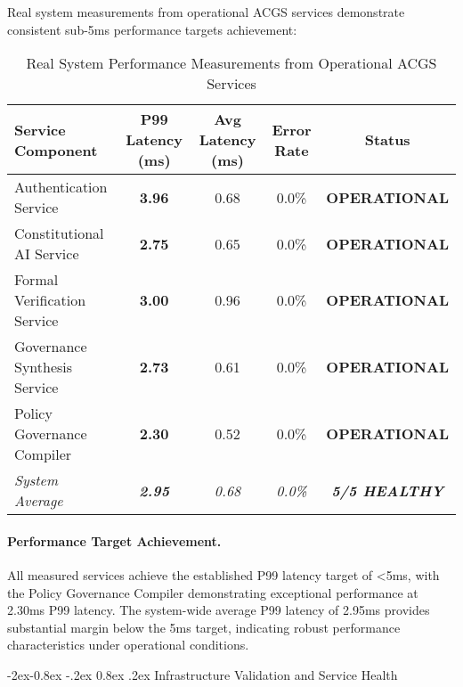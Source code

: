 \documentclass[manuscript,screen,9pt]{acmart}
\makeatletter
\renewcommand\subsubsection{\@startsection{subsubsection}{3}{\z@}%
  {-2ex\@plus -0.8ex \@minus -.2ex}%
  {0.8ex \@plus .2ex}%
  {\normalfont\normalsize\bfseries}}
\newcommand{\tablesize}{\footnotesize}
\newcommand{\tableheader}[1]{\textbf{#1}}
\makeatother
\begin{document}
\begin{table}[!htb]
Real system measurements from operational ACGS services demonstrate consistent sub-5ms performance targets achievement:

\begin{table}[!htb]
\centering
\caption{Real System Performance Measurements from Operational ACGS Services}
\label{tab:real_system_performance}
\tablesize
\begin{tabular}{@{}lcccc@{}}
\toprule
\tableheader{Service Component} & \tableheader{P99 Latency (ms)} & \tableheader{Avg Latency (ms)} & \tableheader{Error Rate} & \tableheader{Status} \\
\midrule
Authentication Service & \textbf{3.96} & 0.68 & 0.0\% & \textbf{OPERATIONAL} \\
Constitutional AI Service & \textbf{2.75} & 0.65 & 0.0\% & \textbf{OPERATIONAL} \\
Formal Verification Service & \textbf{3.00} & 0.96 & 0.0\% & \textbf{OPERATIONAL} \\
Governance Synthesis Service & \textbf{2.73} & 0.61 & 0.0\% & \textbf{OPERATIONAL} \\
Policy Governance Compiler & \textbf{2.30} & 0.52 & 0.0\% & \textbf{OPERATIONAL} \\
\midrule
\textit{System Average} & \textit{\textbf{2.95}} & \textit{0.68} & \textit{0.0\%} & \textit{\textbf{5/5 HEALTHY}} \\
\bottomrule
\end{tabular}
\end{table}

\paragraph{Performance Target Achievement.} All measured services achieve the established P99 latency target of <5ms, with the Policy Governance Compiler demonstrating exceptional performance at 2.30ms P99 latency. The system-wide average P99 latency of 2.95ms provides substantial margin below the 5ms target, indicating robust performance characteristics under operational conditions.

\subsubsection{Infrastructure Validation and Service Health}
\label{subsubsec:infrastructure_validation}


\end{table}
\end{document}
